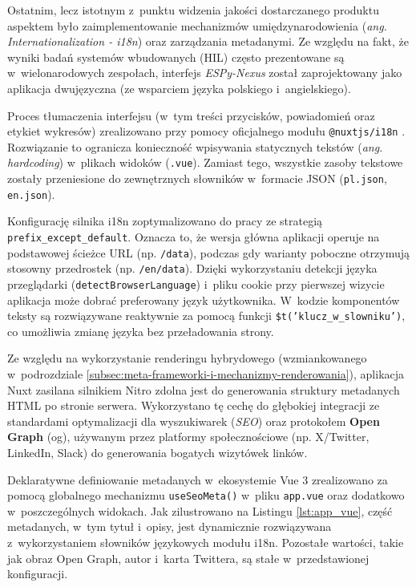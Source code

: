 Ostatnim, lecz istotnym z~punktu widzenia jakości dostarczanego produktu aspektem było zaimplementowanie mechanizmów umiędzynarodowienia (\textit{ang. Internationalization - i18n}) oraz zarządzania metadanymi.
Ze względu na fakt, że wyniki badań systemów wbudowanych (HIL) często prezentowane są w~wielonarodowych zespołach, interfejs \textit{ESPy-Nexus} został zaprojektowany jako aplikacja dwujęzyczna (ze wsparciem języka polskiego i~angielskiego).

Proces tłumaczenia interfejsu (w~tym treści przycisków, powiadomień oraz etykiet wykresów) zrealizowano przy pomocy oficjalnego modułu \texttt{@nuxtjs/i18n} \cite{nuxt_i18n_getting_started}.
Rozwiązanie to ogranicza konieczność wpisywania statycznych tekstów (\textit{ang. hardcoding}) w~plikach widoków (\texttt{.vue}).
Zamiast tego, wszystkie zasoby tekstowe zostały przeniesione do zewnętrznych słowników w~formacie JSON (\texttt{pl.json}, \texttt{en.json}).

Konfigurację silnika i18n zoptymalizowano do pracy ze strategią \texttt{prefix\_except\_default}.
Oznacza to, że wersja główna aplikacji operuje na podstawowej ścieżce URL (np. \texttt{/data}), podczas gdy warianty poboczne otrzymują stosowny przedrostek (np. \texttt{/en/data}).
Dzięki wykorzystaniu detekcji języka przeglądarki (\texttt{detectBrowserLanguage}) i~pliku cookie przy pierwszej wizycie aplikacja może dobrać preferowany język użytkownika.
W~kodzie komponentów teksty są rozwiązywane reaktywnie za pomocą funkcji \texttt{\$t('klucz\_w\_slowniku')}, co umożliwia zmianę języka bez przeładowania strony.

Ze względu na wykorzystanie renderingu hybrydowego (wzmiankowanego w~podrozdziale \ref{subsec:meta-frameworki-i-mechanizmy-renderowania}), aplikacja Nuxt zasilana silnikiem Nitro zdolna jest do generowania struktury metadanych HTML po stronie serwera.
Wykorzystano tę cechę do głębokiej integracji ze standardami optymalizacji dla wyszukiwarek (\textit{SEO}) oraz protokołem \textbf{Open Graph} (og), używanym przez platformy społecznościowe (np. X/Twitter, LinkedIn, Slack) do generowania bogatych wizytówek linków.

Deklaratywne definiowanie metadanych w~ekosystemie Vue 3 zrealizowano za pomocą globalnego mechanizmu \texttt{useSeoMeta()} w~pliku \texttt{app.vue} oraz dodatkowo w~poszczególnych widokach.
Jak zilustrowano na Listingu \ref{lst:app_vue}, część metadanych, w~tym tytuł i~opisy, jest dynamicznie rozwiązywana z~wykorzystaniem słowników językowych modułu i18n.
Pozostałe wartości, takie jak obraz Open Graph, autor i~karta Twittera, są stałe w~przedstawionej konfiguracji.
